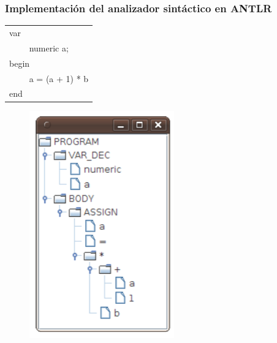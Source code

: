 \documentclass{beamer}
\begin{document}
		\begin{frame}
			\frametitle{Implementaci\'on del analizador sint\'actico en ANTLR}
			
			\begin{multicols}{2}
			    \begin{table}[H]
			        \begin{center}
			            \begin{tabular}{l}
			                var \\
			                ~~~~ numeric a; \\
			                begin \\
			                ~~~~ a = (a + 1) * b \\
			                end \\
			            \end{tabular}
			        \end{center}
			    \end{table}
			    \begin{figure}[H]
			    \begin{center}
			        \includegraphics[scale=.55]{images/ast.png}
			    \end{center}
			\end{figure}
			\end{multicols}
	    \end{frame}
	    
\end{document}
